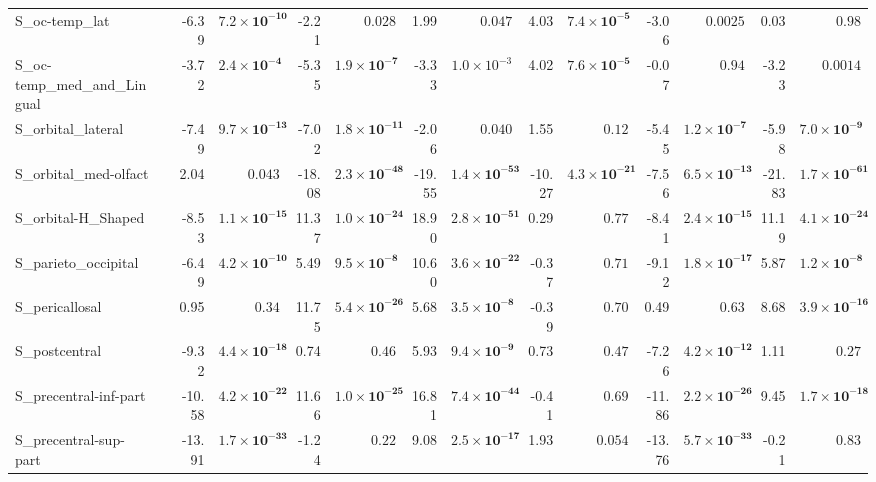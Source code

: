 {\begin{longtable}{llrrrrrrrrrrrr}
S\_oc-temp\_lat &  & -6.39 & $\mathbf{7.2{\times}10^{-10}}$ & -2.21 & $0.028$ & 1.99 & $0.047$ & 4.03 & $\mathbf{7.4{\times}10^{-5}}$ & -3.06 & $0.0025$ & 0.03 & $0.98$ \\
S\_oc-temp\_med\_and\_Lingual &  & -3.72 & $\mathbf{2.4{\times}10^{-4}}$ & -5.35 & $\mathbf{1.9{\times}10^{-7}}$ & -3.33 & $1.0{\times}10^{-3}$ & 4.02 & $\mathbf{7.6{\times}10^{-5}}$ & -0.07 & $0.94$ & -3.23 & $0.0014$ \\
S\_orbital\_lateral &  & -7.49 & $\mathbf{9.7{\times}10^{-13}}$ & -7.02 & $\mathbf{1.8{\times}10^{-11}}$ & -2.06 & $0.040$ & 1.55 & $0.12$ & -5.45 & $\mathbf{1.2{\times}10^{-7}}$ & -5.98 & $\mathbf{7.0{\times}10^{-9}}$ \\
S\_orbital\_med-olfact &  & 2.04 & $0.043$ & -18.08 & $\mathbf{2.3{\times}10^{-48}}$ & -19.55 & $\mathbf{1.4{\times}10^{-53}}$ & -10.27 & $\mathbf{4.3{\times}10^{-21}}$ & -7.56 & $\mathbf{6.5{\times}10^{-13}}$ & -21.83 & $\mathbf{1.7{\times}10^{-61}}$ \\
S\_orbital-H\_Shaped &  & -8.53 & $\mathbf{1.1{\times}10^{-15}}$ & 11.37 & $\mathbf{1.0{\times}10^{-24}}$ & 18.90 & $\mathbf{2.8{\times}10^{-51}}$ & 0.29 & $0.77$ & -8.41 & $\mathbf{2.4{\times}10^{-15}}$ & 11.19 & $\mathbf{4.1{\times}10^{-24}}$ \\
S\_parieto\_occipital &  & -6.49 & $\mathbf{4.2{\times}10^{-10}}$ & 5.49 & $\mathbf{9.5{\times}10^{-8}}$ & 10.60 & $\mathbf{3.6{\times}10^{-22}}$ & -0.37 & $0.71$ & -9.12 & $\mathbf{1.8{\times}10^{-17}}$ & 5.87 & $\mathbf{1.2{\times}10^{-8}}$ \\
S\_pericallosal &  & 0.95 & $0.34$ & 11.75 & $\mathbf{5.4{\times}10^{-26}}$ & 5.68 & $\mathbf{3.5{\times}10^{-8}}$ & -0.39 & $0.70$ & 0.49 & $0.63$ & 8.68 & $\mathbf{3.9{\times}10^{-16}}$ \\
S\_postcentral &  & -9.32 & $\mathbf{4.4{\times}10^{-18}}$ & 0.74 & $0.46$ & 5.93 & $\mathbf{9.4{\times}10^{-9}}$ & 0.73 & $0.47$ & -7.26 & $\mathbf{4.2{\times}10^{-12}}$ & 1.11 & $0.27$ \\
S\_precentral-inf-part &  & -10.58 & $\mathbf{4.2{\times}10^{-22}}$ & 11.66 & $\mathbf{1.0{\times}10^{-25}}$ & 16.81 & $\mathbf{7.4{\times}10^{-44}}$ & -0.41 & $0.69$ & -11.86 & $\mathbf{2.2{\times}10^{-26}}$ & 9.45 & $\mathbf{1.7{\times}10^{-18}}$ \\
S\_precentral-sup-part &  & -13.91 & $\mathbf{1.7{\times}10^{-33}}$ & -1.24 & $0.22$ & 9.08 & $\mathbf{2.5{\times}10^{-17}}$ & 1.93 & $0.054$ & -13.76 & $\mathbf{5.7{\times}10^{-33}}$ & -0.21 & $0.83$ \\

\end{longtable}}
